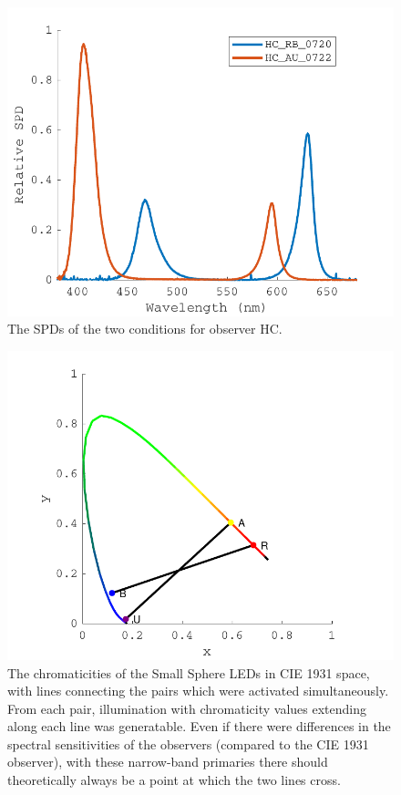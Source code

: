 \begin{figure}[htbp]
\includegraphics[max width=\textwidth,center]{figs/SmallSphere/LED_SPDcontrast.pdf}
\caption{The \glspl{SPD} of the two conditions for observer HC.}
\label{fig:LED_SPDcontrast}
\end{figure}

\begin{figure}[htbp]
\includegraphics[max width=\textwidth,center]{figs/SmallSphere/LED_cross.pdf}
\caption{The chromaticities of the Small Sphere \glspl{LED} in CIE 1931 space, with lines connecting the pairs which were activated simultaneously. From each pair, illumination with chromaticity values extending along each line was generatable. Even if there were differences in the spectral sensitivities of the observers (compared to the CIE 1931 observer), with these narrow-band primaries there should theoretically always be a point at which the two lines cross.}
\label{fig:LED_cross}
\end{figure}

